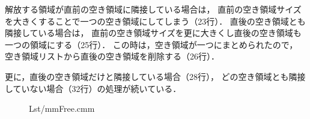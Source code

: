解放する領域が直前の空き領域に隣接している場合は，
直前の空き領域サイズを大きくすることで一つの空き領域にしてしまう（23行）．
直後の空き領域とも隣接している場合は，
直前の空き領域サイズを更に大きくし直後の空き領域も一つの領域にする（25行）．
この時は，空き領域が一つにまとめられたので，
空き領域リストから直後の空き領域を削除する（26行）．

更に，直後の空き領域だけと隣接している場合（28行），
どの空き領域とも隣接していない場合（32行）の処理が続いている．

\begin{figure}[btph]

{Lst/mmFree.cmm}
\end{figure}
